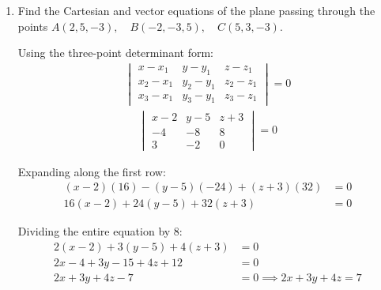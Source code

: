 \begin{enumerate}[label=\thesubsection.\arabic*, ref=\thesubsection.\theenumi]
Given that $\dfrac{dV}{dt} = 8\text{ cm}^3/\text{s}$:
\begin{align*}
	8 &= 3x^2 \frac{dx}{dt} \implies
	\frac{dx}{dt} = \frac{8}{3x^2}
\end{align*}

Differentiating $S$ with respect to time $t$:
\begin{align*}
	\frac{dS}{dt} = \frac{d}{dt}(6x^2) = 12x \frac{dx}{dt}
\end{align*}

Substituting the expression for $\dfrac{dx}{dt}$:
\begin{align*}
	\frac{dS}{dt} &= 12x \left(\frac{8}{3x^2}\right) 
	= \frac{96x}{3x^2} 
	= \frac{32}{x}
\end{align*}

Evaluating at $x = 12\text{ cm}$:
\begin{align*}
	\left.\frac{dS}{dt}\right|_{x=12} &= \frac{32}{12} = \frac{8}{3}\text{ cm}^2/\text{s}
\end{align*}

\item Find the Cartesian and vector equations of the plane passing through the points $A(2,5,-3),\quad B(-2,-3,5),\quad C(5,3,-3)$.

\solution
Using the three-point determinant form:
\begin{align*}
	\begin{vmatrix}
		x - x_1 & y - y_1 & z - z_1 \\
		x_2 - x_1 & y_2 - y_1 & z_2 - z_1 \\
		x_3 - x_1 & y_3 - y_1 & z_3 - z_1
	\end{vmatrix} = 0
\end{align*}
\begin{align*}
	\begin{vmatrix}
		x - 2 & y - 5 & z + 3 \\
		-4 & -8 & 8 \\
		3 & -2 & 0
	\end{vmatrix} = 0
\end{align*}

Expanding along the first row:
\begin{align*}
	(x - 2)(16) - (y - 5)(-24) + (z + 3)(32) &= 0 \\
	16(x - 2) + 24(y - 5) + 32(z + 3) &= 0
\end{align*}

Dividing the entire equation by $8$:
\begin{align*}
	2(x - 2) + 3(y - 5) + 4(z + 3) &= 0 \\
	2x - 4 + 3y - 15 + 4z + 12 &= 0 \\
	2x + 3y + 4z - 7 &= 0 \implies 2x + 3y + 4z = 7
\end{align*}


\end{enumerate}
